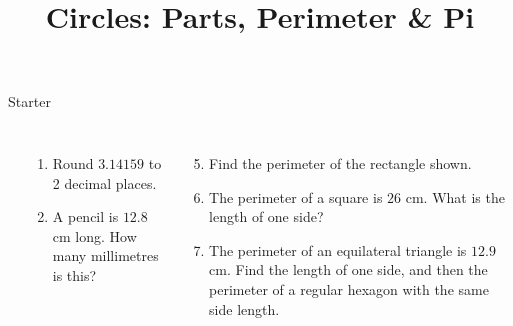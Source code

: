 \documentclass{beamer}
\title{Circles: Parts, Perimeter \& Pi}
\author{}
\date{}
\newcommand{\ablank}[1]{%
  \alt<2>{\textcolor{red}{#1}}{\underline{\phantom{#1}}}%
}
\newcommand{\ashow}[1]{\uncover<2->{\textcolor{red}{\small #1}}}
\newcommand{\ashowq}[1]{\alt<2->{\textcolor{red}{\small #1}}{?}}
\begin{document}
\frame{\titlepage}

\begin{frame}{Starter}


\begin{columns}

\begin{center}
\end{center}

\small
\begin{enumerate}
  \item Round $3.14159$ to 2 decimal places. \ashow{3.14}
  \item A pencil is $12.8$ cm long. How many millimetres is this? \ablank{128 mm}
\end{enumerate}

\begin{enumerate}
  \setcounter{enumi}{4}
  \item Find the perimeter of the rectangle shown. \ashow{25.4 cm}
  \item The perimeter of a square is $26$ cm. What is the length of one side? \ashow{6.5 cm}
  \item  The perimeter of an equilateral triangle is $12.9$ cm. 
    Find the length of one side, and then the perimeter of a regular hexagon with the same side length. \ashow{$4.3$ cm; hexagon: $25.8$ cm}
\end{enumerate}

\end{columns}
\end{frame}
\end{document}
